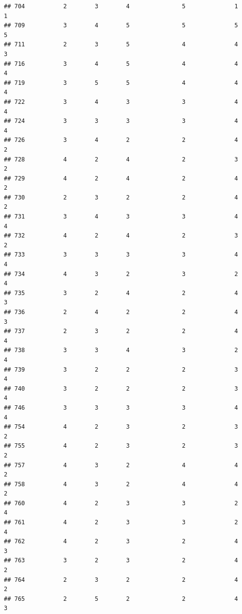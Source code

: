\documentclass[
]{article}
\begin{document}
\begin{verbatim}
## 704           2        3        4               5              1             1
## 709           3        4        5               5              5             5
## 711           2        3        5               4              4             3
## 716           3        4        5               4              4             4
## 719           3        5        5               4              4             4
## 722           3        4        3               3              4             4
## 724           3        3        3               3              4             4
## 726           3        4        2               2              4             2
## 728           4        2        4               2              3             2
## 729           4        2        4               2              4             2
## 730           2        3        2               2              4             2
## 731           3        4        3               3              4             4
## 732           4        2        4               2              3             2
## 733           3        3        3               3              4             4
## 734           4        3        2               3              2             4
## 735           3        2        4               2              4             3
## 736           2        4        2               2              4             3
## 737           2        3        2               2              4             4
## 738           3        3        4               3              2             4
## 739           3        2        2               2              3             4
## 740           3        2        2               2              3             4
## 746           3        3        3               3              4             4
## 754           4        2        3               2              3             2
## 755           4        2        3               2              3             2
## 757           4        3        2               4              4             2
## 758           4        3        2               4              4             2
## 760           4        2        3               3              2             4
## 761           4        2        3               3              2             4
## 762           4        2        3               2              4             3
## 763           3        2        3               2              4             2
## 764           2        3        2               2              4             2
## 765           2        5        2               2              4             3

\end{verbatim}
\end{document}
